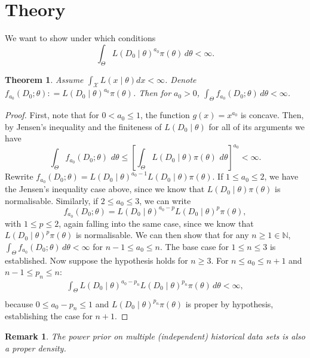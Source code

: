 \documentclass[a4paper, notitlepage, 11pt]{article}
\newtheorem{theorem}{Theorem}[]
\newtheorem{remark}{Remark}[]
\begin{document}
\section{Theory}

We want to show under which conditions
\[\int_{\Theta} L( D_0 \mid \theta)^{a_0}\pi(\theta) \, d\theta <\infty.\]
\begin{theorem}
\label{thm:integrability}
 Assume $\int_{\mathcal{X}} L( x \mid \theta)dx < \infty$.
 Denote $f_{a_0}(D_0;\theta) : = L( D_0 \mid \theta)^{a_0}\pi(\theta)$.
 Then for $a_0 > 0$, $\int_{\Theta} f_{a_0}(D_0;\theta) \, d\theta <\infty$.
\end{theorem}
\begin{proof}
First, note that for $0 < a_0 \leq 1$, the function $g(x) = x^{a_0}$ is concave.
Then, by Jensen's inequality and the finiteness of $L( D_0 \mid \theta)$ for all of its arguments we have
\[ \int_{\Theta} f_{a_0}(D_0; \theta) \, \, d\theta \leq \left[ \int_{\Theta} L(D_0  \mid \theta)\pi(\theta) \, \, d\theta \right]^{a_0} < \infty. \]
Rewrite $f_{a_0}(D_0; \theta) = L(D_0 \mid \theta)^{a_0 -1} L(D_0 \mid \theta)\pi(\theta)$.
If $1 \leq a_0 \leq 2$, we have the Jensen's inequality case above, since we know that $L(D_0 \mid \theta)\pi(\theta)$ is normalisable.
Similarly, if $2 \leq a_0 \leq 3$, we can write 
\[  f_{a_0}(D_0; \theta) = L(D_0 \mid \theta)^{a_0-p} L(D_0 \mid \theta)^p\pi(\theta), \]
with $1 \leq p \leq 2$, again falling into the same case, since we know that $L(D_0 \mid \theta)^{p}\pi(\theta)$ is normalisable.
We can then show that for any $n \geq 1 \in \mathbb{N}$, $\int_{\Theta}f_{a_0}( D_0 ; \theta)\, d\theta < \infty$ for  $n-1 \leq a_0 \leq n$.
The base case for $1 \leq n \leq 3$ is established.
Now suppose the hypothesis holds for $n \geq 3$.
For $ n \leq  a_0 \leq n + 1$ and $n-1 \leq p_n \leq n$:
\begin{align*}
 \int_{\Theta} L(D_0 \mid \theta)^{a_0-p_n} L(D_0 \mid \theta)^{p_n}\pi(\theta)\, d\theta < \infty, \\
\end{align*}
because $0 \leq a_0 - p_n \leq 1$ and $L(D_0 \mid \theta)^{p_n}\pi(\theta)$ is proper by hypothesis, establishing the case for $n + 1$.
\end{proof}
\begin{remark}
 The power prior on multiple (independent) historical data sets is also a proper density.
\end{remark}
\end{document}
